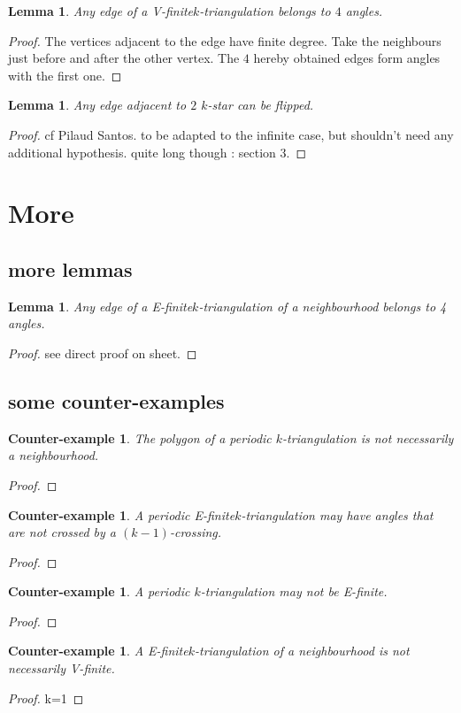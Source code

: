 \documentclass{amsart}
\newtheorem{lemma}[theorem]{Lemma}
\newtheorem{ce}[theorem]{Counter-example}
\theoremstyle{remark}
\newcommand*{\nbd}[0]{neighbourhood\xspace}
\newcommand*{\ef}[0]{E-finite\xspace}
\newcommand*{\vf}[0]{V-finite\xspace}
\newcommand*{\ktg}[0]{$k$-triangulation\xspace}
\begin{document}
\begin{lemma}
Any edge of a \vf \ktg belongs to $4$ angles.
\end{lemma}
\begin{proof}
The vertices adjacent to the edge have finite degree. Take the neighbours just before and after the other vertex. The $4$ hereby obtained edges form angles with the first one.
\end{proof}

\begin{lemma}
Any edge adjacent to $2$ $k$-star can be flipped.
\end{lemma}
\begin{proof}
cf Pilaud Santos. to be adapted to the infinite case, but shouldn't need any additional hypothesis. quite long though : section 3.
\end{proof}

\section{More}

\subsection{more lemmas}

\begin{lemma} 
Any edge of a \ef \ktg of a \nbd belongs to 4 angles. 
\end{lemma}
\begin{proof}
see direct proof on sheet.
\end{proof}

\subsection{some counter-examples}

\begin{ce}
The polygon of a periodic \ktg is not necessarily a \nbd.
\end{ce}
\begin{proof}

\end{proof}

\begin{ce}
A periodic \ef \ktg may have angles that are not crossed by a $(k-1)$-crossing.
\end{ce}
\begin{proof}

\end{proof}

\begin{ce} 
A periodic \ktg may not be \ef.
\end{ce}
\begin{proof}

\end{proof}

\begin{ce}
A \ef \ktg of a \nbd is not necessarily \vf.
\end{ce}
\begin{proof}
k=1
\end{proof}





\end{document}
